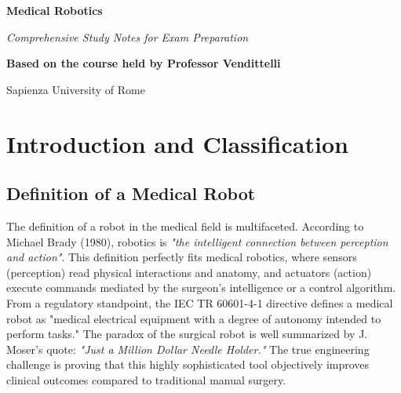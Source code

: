 \documentclass[11pt,a4paper,twoside]{report}
\begin{document}
\begin{titlepage}
    \centering
    \vspace*{2cm}
    {\fontsize{38}{45}\selectfont \bfseries Medical Robotics\par}
    \vspace{1.5cm}
    {\Large \itshape Comprehensive Study Notes for Exam Preparation\par}
    \vspace{1.5cm}
    {\large \textbf{Based on the course held by Professor Vendittelli}\par}
    \vspace{0.5cm}
    {\large Sapienza University of Rome\par}
    \vspace{3cm}
    \vfill
\end{titlepage}

\tableofcontents
\newpage

\chapter{Introduction and Classification}

\section{Definition of a Medical Robot}
The definition of a robot in the medical field is multifaceted. According to Michael Brady (1980), robotics is \textit{"the intelligent connection between perception and action"}. This definition perfectly fits medical robotics, where sensors (perception) read physical interactions and anatomy, and actuators (action) execute commands mediated by the surgeon's intelligence or a control algorithm. From a regulatory standpoint, the IEC TR 60601-4-1 directive defines a medical robot as "medical electrical equipment with a degree of autonomy intended to perform tasks."
The paradox of the surgical robot is well summarized by J. Moser's quote: \textit{"Just a Million Dollar Needle Holder."} The true engineering challenge is proving that this highly sophisticated tool objectively improves clinical outcomes compared to traditional manual surgery.
\end{document}
